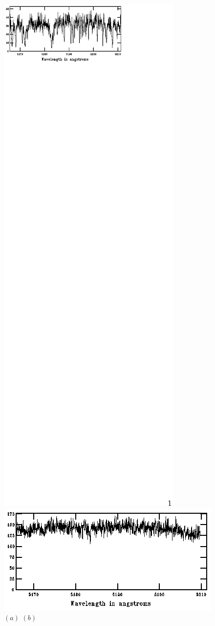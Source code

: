\begin{figure}
\begin{center}
\centering
\includegraphics[width=.45\textwidth]{2_f4a}
\hspace{1cm}	
\includegraphics[width=.45\textwidth]{2_f4b}\\
\textsc{\small $(a)$	\hspace{7cm}	$(b)$}\\

\end{center}
\end{figure}
